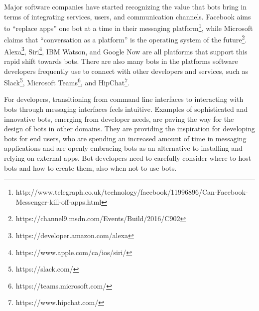 \documentclass{sig-alternate}
\newcommand{\cp}[1]{\textcolor{red}{{\it [Cassie says: #1]}}}
\begin{document}
Major software companies have started recognizing the value that bots bring in terms of integrating services, users, and communication channels. Facebook aims to ``replace apps'' one bot at a time in their messaging platform\footnote{http://www.telegraph.co.uk/technology/facebook/11996896/Can-Facebook-Messenger-kill-off-apps.html}, while Microsoft claims that ``conversation as a platform'' is the operating system of the future\footnote{https://channel9.msdn.com/Events/Build/2016/C902}. 
Alexa\footnote{https://developer.amazon.com/alexa\label{Alexa}}, Siri\footnote{https://www.apple.com/ca/ios/siri/\label{Siri}}, IBM Watson, and Google Now
are all platforms that support this rapid shift towards bots. 
There are also many bots in the platforms software developers frequently use to connect with other developers and services, such as Slack\footnote{https://slack.com/\label{Slack}}, Microsoft Teams\footnote{https://teams.microsoft.com/\label{Teams}}, and HipChat\footnote{https://www.hipchat.com/\label{Hipchat}}. 


For developers, transitioning from command line interfaces to interacting with bots through messaging interfaces feels intuitive.
Examples of sophisticated and innovative bots, emerging from developer needs, are paving the way for the design of bots in other domains. 
They are providing the inspiration for developing bots for end users, who are spending an increased amount of time in messaging applications and are openly embracing bots as an alternative to installing and relying on external apps.
Bot developers need to carefully consider where to host bots and how to create them, also when not to use bots. 
\end{document}
